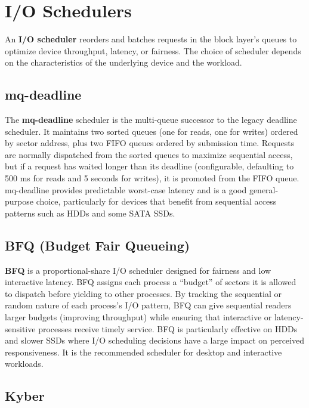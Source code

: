\section{I/O Schedulers}
\label{sec:io-schedulers}

An \textbf{I/O scheduler} reorders and batches requests in the block layer's queues to optimize device throughput, latency, or fairness. The choice of scheduler depends on the characteristics of the underlying device and the workload.

\subsection{mq-deadline}

The \textbf{mq-deadline} scheduler is the multi-queue successor to the legacy deadline scheduler. It maintains two sorted queues (one for reads, one for writes) ordered by sector address, plus two FIFO queues ordered by submission time. Requests are normally dispatched from the sorted queues to maximize sequential access, but if a request has waited longer than its deadline (configurable, defaulting to 500 ms for reads and 5 seconds for writes), it is promoted from the FIFO queue. mq-deadline provides predictable worst-case latency and is a good general-purpose choice, particularly for devices that benefit from sequential access patterns such as HDDs and some SATA SSDs.

\subsection{BFQ (Budget Fair Queueing)}

\textbf{BFQ} is a proportional-share I/O scheduler designed for fairness and low interactive latency. BFQ assigns each process a ``budget'' of sectors it is allowed to dispatch before yielding to other processes. By tracking the sequential or random nature of each process's I/O pattern, BFQ can give sequential readers larger budgets (improving throughput) while ensuring that interactive or latency-sensitive processes receive timely service. BFQ is particularly effective on HDDs and slower SSDs where I/O scheduling decisions have a large impact on perceived responsiveness. It is the recommended scheduler for desktop and interactive workloads.

\subsection{Kyber}

